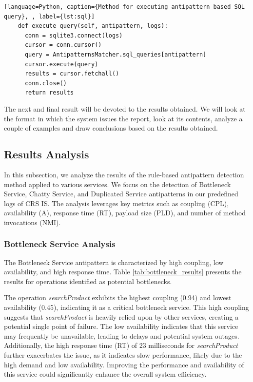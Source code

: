 \documentclass[12pt, times]{article}
\begin{document}
	\begin{lstlisting}[language=Python, caption={Method for executing antipattern based SQL query}, , label={lst:sql}]
	def execute_query(self, antipattern, logs):
	  conn = sqlite3.connect(logs)
	  cursor = conn.cursor()
	  query = AntipatternsMatcher.sql_queries[antipattern]
	  cursor.execute(query)
	  results = cursor.fetchall()
	  conn.close()
	  return results
	\end{lstlisting}	
	
	\hspace*{5mm}The next and final result will be devoted to the results obtained. We will look at the format in which the system issues the report, look at its contents, analyze a couple of examples and draw conclusions based on the results obtained.
	
	\subsection{Results Analysis}
	\label{sec:res}
	
	\hspace*{5mm} In this subsection, we analyze the results of the rule-based antipattern detection method applied to various services. We focus on the detection of Bottleneck Service, Chatty Service, and Duplicated Service antipatterns in our predefined logs of CRS IS. The analysis leverages key metrics such as coupling (CPL), availability (A), response time (RT), payload size (PLD), and number of method invocations (NMI).
	
	\subsubsection{Bottleneck Service Analysis}
	\hspace*{5mm} The Bottleneck Service antipattern is characterized by high coupling, low availability, and high response time. Table \ref{tab:bottleneck_results} presents the results for operations identified as potential bottlenecks.
	
	\hspace*{5mm} The operation \textit{searchProduct} exhibits the highest coupling (0.94) and lowest availability (0.45), indicating it as a critical bottleneck service. This high coupling suggests that \textit{searchProduct} is heavily relied upon by other services, creating a potential single point of failure. The low availability indicates that this service may frequently be unavailable, leading to delays and potential system outages. Additionally, the high response time (RT) of 23 milliseconds for \textit{searchProduct} further exacerbates the issue, as it indicates slow performance, likely due to the high demand and low availability. Improving the performance and availability of this service could significantly enhance the overall system efficiency.
	
\end{document}
